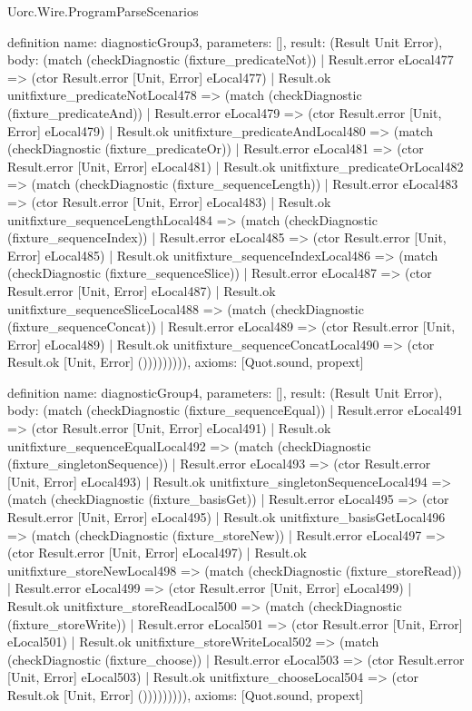 \begin{lexlean}{Uorc.Wire.ProgramParseScenarios}
\begin{semanticmodule}
definition{
  name: diagnosticGroup3,
  parameters: [],
  result: (Result Unit Error),
  body: (match (checkDiagnostic (fixture_predicateNot))
    | Result.error eLocal477 => (ctor Result.error [Unit, Error] eLocal477)
    | Result.ok unitfixture_predicateNotLocal478 => (match (checkDiagnostic (fixture_predicateAnd))
      | Result.error eLocal479 => (ctor Result.error [Unit, Error] eLocal479)
      | Result.ok unitfixture_predicateAndLocal480 => (match (checkDiagnostic (fixture_predicateOr))
        | Result.error eLocal481 => (ctor Result.error [Unit, Error] eLocal481)
        | Result.ok unitfixture_predicateOrLocal482 => (match (checkDiagnostic (fixture_sequenceLength))
          | Result.error eLocal483 => (ctor Result.error [Unit, Error] eLocal483)
          | Result.ok unitfixture_sequenceLengthLocal484 => (match (checkDiagnostic (fixture_sequenceIndex))
            | Result.error eLocal485 => (ctor Result.error [Unit, Error] eLocal485)
            | Result.ok unitfixture_sequenceIndexLocal486 => (match (checkDiagnostic (fixture_sequenceSlice))
              | Result.error eLocal487 => (ctor Result.error [Unit, Error] eLocal487)
              | Result.ok unitfixture_sequenceSliceLocal488 => (match (checkDiagnostic (fixture_sequenceConcat))
                | Result.error eLocal489 => (ctor Result.error [Unit, Error] eLocal489)
                | Result.ok unitfixture_sequenceConcatLocal490 => (ctor Result.ok [Unit, Error] ())))))))),
  axioms: [Quot.sound, propext]
}

definition{
  name: diagnosticGroup4,
  parameters: [],
  result: (Result Unit Error),
  body: (match (checkDiagnostic (fixture_sequenceEqual))
    | Result.error eLocal491 => (ctor Result.error [Unit, Error] eLocal491)
    | Result.ok unitfixture_sequenceEqualLocal492 => (match (checkDiagnostic (fixture_singletonSequence))
      | Result.error eLocal493 => (ctor Result.error [Unit, Error] eLocal493)
      | Result.ok unitfixture_singletonSequenceLocal494 => (match (checkDiagnostic (fixture_basisGet))
        | Result.error eLocal495 => (ctor Result.error [Unit, Error] eLocal495)
        | Result.ok unitfixture_basisGetLocal496 => (match (checkDiagnostic (fixture_storeNew))
          | Result.error eLocal497 => (ctor Result.error [Unit, Error] eLocal497)
          | Result.ok unitfixture_storeNewLocal498 => (match (checkDiagnostic (fixture_storeRead))
            | Result.error eLocal499 => (ctor Result.error [Unit, Error] eLocal499)
            | Result.ok unitfixture_storeReadLocal500 => (match (checkDiagnostic (fixture_storeWrite))
              | Result.error eLocal501 => (ctor Result.error [Unit, Error] eLocal501)
              | Result.ok unitfixture_storeWriteLocal502 => (match (checkDiagnostic (fixture_choose))
                | Result.error eLocal503 => (ctor Result.error [Unit, Error] eLocal503)
                | Result.ok unitfixture_chooseLocal504 => (ctor Result.ok [Unit, Error] ())))))))),
  axioms: [Quot.sound, propext]
}


\end{semanticmodule}
\end{lexlean}
